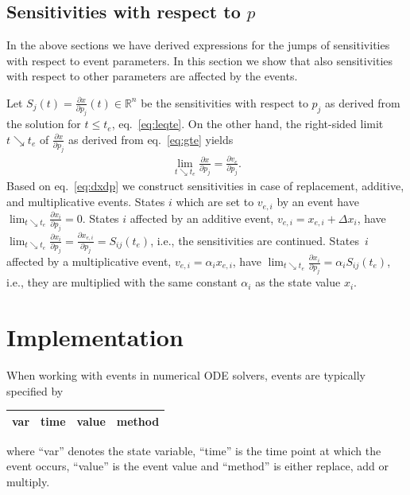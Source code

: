 \documentclass[journal, a4paper]{IEEEtran}
\begin{document}
\subsection{Sensitivities with respect to $p$}


In the above sections we have derived expressions for the jumps of sensitivities with respect to event parameters. In this section we show that also sensitivities with respect to other parameters are affected by the events.

Let
$S_j(t) = \frac{\partial x}{\partial p_j}(t) \in \mathbb R^n$
be the sensitivities with respect to $p_j$ as derived from the solution for $t \leq t_e$, eq.~\eqref{eq:leqte}. On the other hand, the right-sided limit $t\searrow t_e$ of $\frac{\partial x}{\partial p_j}$ as derived from eq.~\eqref{eq:gte} yields
\begin{align}
    \lim_{t\searrow t_e}\frac{\partial x}{\partial p_j} = \frac{\partial v_e}{\partial p_j}.
    \label{eq:dxdp}
\end{align}
Based on eq.~\eqref{eq:dxdp} we construct sensitivities in case of replacement, additive, and multiplicative events. States $i$ which are set to $v_{e, i}$ by an event have $\lim_{t\searrow t_e}\frac{\partial x_i}{\partial p_j} = 0$. States $i$ affected by an additive event, $v_{e, i} = x_{e, i} + \Delta x_i$, have $\lim_{t\searrow t_e}\frac{\partial x_i}{\partial p_j} = \frac{\partial x_{e, i}}{\partial p_j} = S_{ij}(t_e)$, i.e., the sensitivities are continued. States~$i$ affected by a multiplicative event, $v_{e, i} = \alpha_i x_{e, i}$, have $\lim_{t\searrow t_e}\frac{\partial x_i}{\partial p_j} = \alpha_i S_{ij}(t_e)$, i.e., they are multiplied with the same constant $\alpha_i$ as the state value $x_i$.


\section{Implementation}


When working with events in numerical ODE solvers, events are typically specified by
\begin{center}
\begin{tabular}{|c|c|c|c|}\hline
     var & time & value & method \\
     \hline
\end{tabular}
\end{center}
where ``var'' denotes the state variable, ``time'' is the time point at which the event occurs, ``value'' is the event value and ``method'' is either replace, add or multiply.
\end{document}
